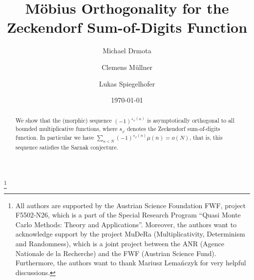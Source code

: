 \documentclass[12pt]{amsart}
\begin{document}
\title{M\"obius Orthogonality for the Zeckendorf Sum-of-Digits Function}

\author{Michael Drmota}
\address{Institut f\"ur Diskrete Mathematik und Geometrie
TU Wien\\
Wiedner Hauptstr. 8--10\\
1040 Wien, Austria}
\author{Clemens M\"ullner}
\address{Institut f\"ur Diskrete Mathematik und Geometrie
TU Wien\\
Wiedner Hauptstr. 8--10\\
1040 Wien, Austria}
\author{Lukas Spiegelhofer}
\address{Institut f\"ur Diskrete Mathematik und Geometrie
TU Wien\\
Wiedner Hauptstr. 8--10\\
1040 Wien, Austria}

\date{\today} 
\thanks{All authors are supported by the
Austrian Science Foundation FWF, project F5502-N26, which is a part of the Special Research Program ``Quasi Monte Carlo Methods: Theory and Applications''.
Moreover, the authors want to acknowledge support by the project MuDeRa (Multiplicativity, Determinism and Randomness), 
which is a joint project between the ANR (Agence Nationale de la Recherche) and the FWF (Austrian Science Fund).
Furthermore, the authors want to thank Mariusz Lema\'nczyk for very helpful discussions.
}

\begin{abstract}
We show that the (morphic) sequence $(-1)^{s_\varphi(n)}$ is asymptotically orthogonal to all bounded multiplicative functions,
where $s_\varphi$ denotes the Zeckendorf sum-of-digits function.
In particular we have $\sum_{n<N} (-1)^{s_\varphi(n)} \mu(n) = o(N)$, that is, this sequence satisfies the Sarnak conjecture.
\end{abstract}

\maketitle
\end{document}
